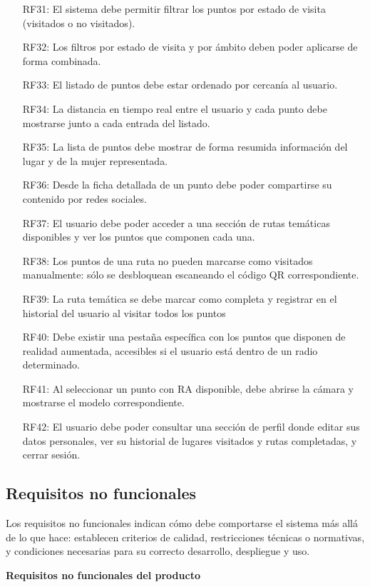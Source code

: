 \begin{itemize}
\item[RF31:] El sistema debe permitir filtrar los puntos por estado de visita (visitados o no visitados).
\item[RF32:] Los filtros por estado de visita y por ámbito deben poder aplicarse de forma combinada.
\item[RF33:] El listado de puntos debe estar ordenado por cercanía al usuario.
\item[RF34:] La distancia en tiempo real entre el usuario y cada punto debe mostrarse junto a cada entrada del listado.
\item[RF35:] La lista de puntos debe mostrar de forma resumida información del lugar y de la mujer representada.
\item[RF36:] Desde la ficha detallada de un punto debe poder compartirse su contenido por redes sociales.
\item[RF37:] El usuario debe poder acceder a una sección de rutas temáticas disponibles y ver los puntos que componen cada una.
\item[RF38:] Los puntos de una ruta no pueden marcarse como visitados manualmente: sólo se desbloquean escaneando el código QR correspondiente.
\item[RF39:] La ruta temática se debe marcar como completa y registrar en el historial del usuario al visitar todos los puntos
\item[RF40:] Debe existir una pestaña específica con los puntos que disponen de realidad aumentada, accesibles si el usuario está dentro de un radio determinado.
\item[RF41:] Al seleccionar un punto con RA disponible, debe abrirse la cámara y mostrarse el modelo correspondiente.
\item[RF42:] El usuario debe poder consultar una sección de perfil donde editar sus datos personales, ver su historial de lugares visitados y rutas completadas, y cerrar sesión.

\end{itemize}

\subsection{Requisitos no funcionales}
Los requisitos no funcionales indican cómo debe comportarse el sistema más allá de lo que hace: establecen criterios de calidad, restricciones técnicas o normativas, y condiciones necesarias para su correcto desarrollo, despliegue y uso.

\textbf{Requisitos no funcionales del producto}

